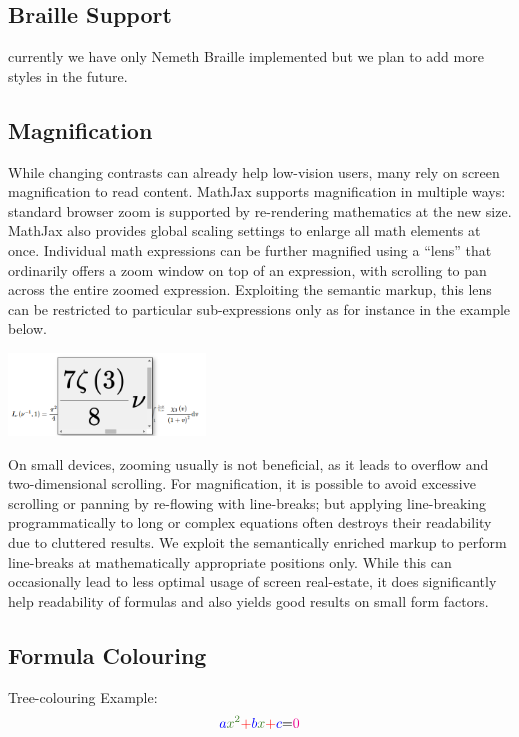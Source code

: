 \documentclass{sig-alternate}
\begin{document}
\subsection{Braille Support}

currently we have only Nemeth Braille implemented but we plan to add more styles
in the future.


\subsection{Magnification}

While changing contrasts can already help low-vision users, many rely on screen
magnification to read content.  MathJax supports magnification in multiple ways:
standard browser zoom is supported by re-rendering mathematics at the new size.
MathJax also provides global scaling settings to enlarge all math
elements at once.  Individual math expressions can be further magnified using a
``lens'' that ordinarily offers a zoom window on top of an expression, with
scrolling to pan across the entire zoomed expression. Exploiting the semantic markup,
this lens can be restricted to particular sub-expressions only as for instance
in the example below.

\qquad\qquad\includegraphics[height=2.2cm]{zoom}

On small devices, zooming usually is not beneficial, as it leads to overflow and
two-dimensional scrolling.  For magnification, it is possible to avoid excessive
scrolling or panning by re-flowing with line-breaks; but applying line-breaking
programmatically to long or complex equations often destroys their readability
due to cluttered results. We exploit the semantically enriched markup to perform
line-breaks at mathematically appropriate positions only. While this can
occasionally lead to less optimal usage of screen real-estate, it does
significantly help readability of formulas and also yields good results on small
form factors.

\subsection{Formula Colouring}

Tree-colouring
    Example: \[\color{blue}{a}\color{OliveGreen}{x^2}\color{red}{+}\color{blue}{b}
    \color{OliveGreen}{x}\color{red}{+}\color{blue}{c}\color{black}{=}\color{magenta}{0}\]
\end{document}
